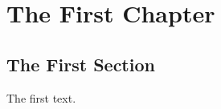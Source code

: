 \documentclass[../m165main.tex]{subfiles}
\begin{document}
\chapter{The First Chapter}
\section{The First Section}
The first text.
\end{document}
